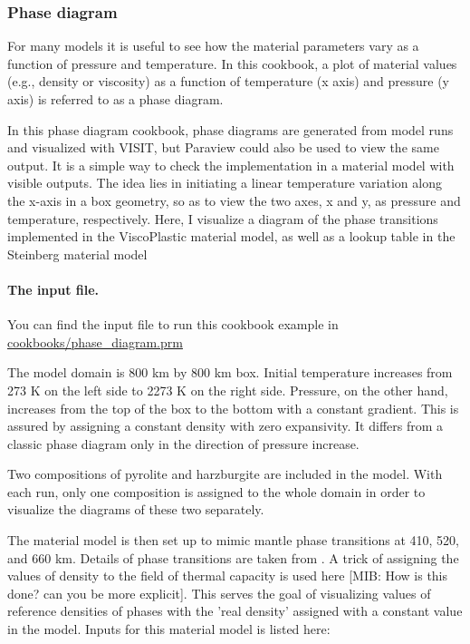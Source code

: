 \subsubsection{Phase diagram}

\label{sec:phase-diagram}
For many models it is useful to see how the material parameters vary as a function of pressure and temperature. In this cookbook, a plot of material values (e.g., density or viscosity) as a function of temperature (x axis) and pressure (y axis) is referred to as a phase diagram. 

In this phase diagram cookbook, phase diagrams are generated from model runs and visualized with VISIT, but Paraview could also be used to view the same output. %
It is a simple way to check the implementation in a material model with visible outputs.%
The idea lies in initiating a linear temperature variation along the x-axis in a box geometry, so as to view the two axes, x and y,  as pressure and temperature, respectively. %
Here, I visualize a diagram of the phase transitions implemented in the ViscoPlastic material model, as well as a lookup table in the Steinberg material model%

\paragraph{The input file.}
You can find the input file to run this cookbook example in \url{cookbooks/phase_diagram.prm}

\par The model domain is  800 km  by 800 km box. %
Initial temperature increases from 273 K on the left side to 2273 K on the right side. %
Pressure, on the other hand, increases from the top of the box to the bottom with a constant gradient.
This is assured by assigning a constant density with zero expansivity.
It differs from a classic phase diagram only in the direction of pressure increase.

\par Two compositions of pyrolite and harzburgite are included in the model. %
With each run, only one composition is assigned to the whole domain in order to visualize the diagrams of these two separately.

\par The material model is then set up to mimic mantle phase transitions at 410, 520, and 660 km.%
Details of phase transitions are taken from \cite{billen2018decoupling}.
A trick of assigning the values of density to the field of thermal capacity is used here [MIB: How is this done? can you be more explicit]. %
This serves the goal of visualizing values of reference densities of phases with the 'real density' assigned with a constant value in the model.
Inputs for this material model is listed here:



